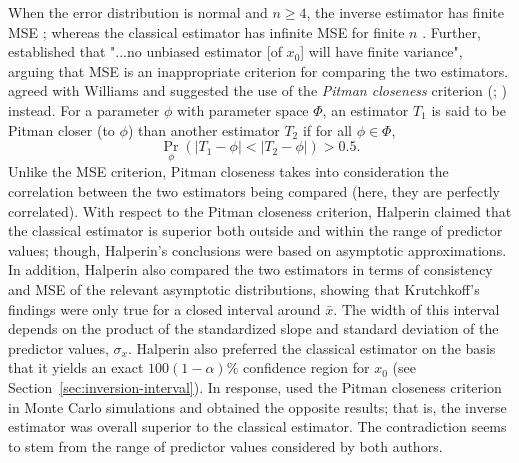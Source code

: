 \documentclass[cmfont,usenames,dvipsnames,leqno]{afit-etd}\usepackage[]{graphicx}\usepackage[]{color}
\newcommand{\Prob}{\operatorname{Pr}}
\begin{document}
When the error distribution is normal and $n \ge 4$, the inverse estimator has finite \ac{MSE} \citep{oman_exact_1985}; whereas the classical estimator has infinite \ac{MSE} for finite $n$ \citep{williams_note_1969}. Further, \citet{williams_note_1969} established that "...no unbiased estimator [of $x_0$] will have finite variance", arguing that \ac{MSE} is an inappropriate criterion for comparing the two estimators. \citet{halperin_inverse_1970} agreed with Williams and suggested the use of the \textit{Pitman closeness} criterion (\citealt{pitman_closest_1937}; \citealt[pg. 290]{mood_introduction_1974}) instead. For a parameter $\phi$ with parameter space $\Phi$, an estimator $T_1$ is said to be Pitman closer (to $\phi$) than another estimator $T_2$ if for all $\phi \in \Phi$,
\begin{equation}
  \Prob_\phi\left(|T_1 - \phi| < |T_2 - \phi|\right) > 0.5.
\end{equation}
Unlike the \ac{MSE} criterion, Pitman closeness takes into consideration the correlation between the two estimators being compared (here, they are perfectly correlated). With respect to the Pitman closeness criterion, Halperin claimed that the classical estimator is superior both outside and within the range of predictor values; though, Halperin's conclusions were based on asymptotic approximations. In addition, Halperin also compared the two estimators in terms of consistency and \ac{MSE} of the relevant asymptotic distributions, showing that Krutchkoff's findings were only true for a closed interval around $\bar{x}$. The width of this interval depends on the product of the standardized slope and standard deviation of the predictor values, $\sigma_x$. Halperin also preferred the classical estimator on the basis that it yields an exact $100(1 - \alpha)\%$ confidence region for $x_0$ (see Section~\ref{sec:inversion-interval}). In response, \citet{krutchkoff_calibration_1972} used the Pitman closeness criterion in Monte Carlo simulations and obtained the opposite results; that is, the inverse estimator was overall superior to the classical estimator. The contradiction seems to stem from the range of predictor values considered by both authors.
\end{document}
